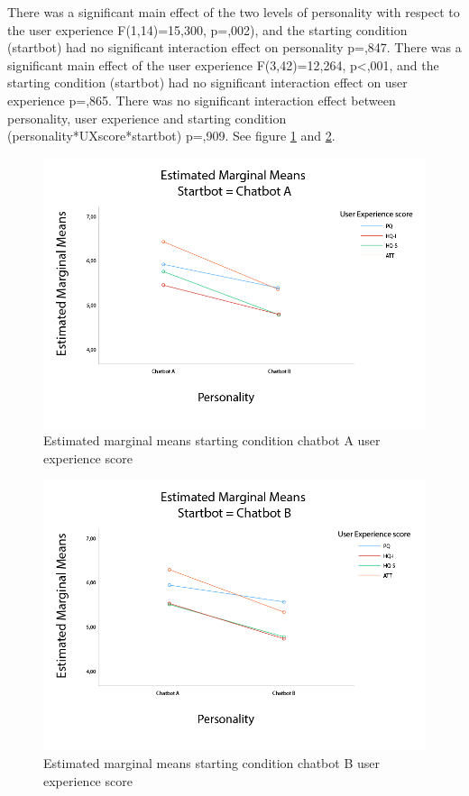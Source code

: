 There was a significant main effect of the two levels of personality with respect to the user experience F(1,14)=15,300, p=,002), and the starting condition (startbot) had no significant interaction effect on personality p=,847. There was a significant main effect of the user experience F(3,42)=12,264, p<,001, and the starting condition (startbot) had no significant interaction effect on user experience p=,865. There was no significant interaction effect between personality, user experience and starting condition (personality*UXscore*startbot) p=,909. See figure \ref{fig:startA} and \ref{fig:startB}.

\begin{figure}[h]
    \centering
    \includegraphics[scale=0.4]{figures/MMeanStartbotA.png}
    \caption{Estimated marginal means starting condition chatbot A user experience score}
    \label{fig:startA}
\end{figure}

\begin{figure}
    \centering
    \includegraphics[scale=0.4]{figures/MMeanStartbotB.png}
    \caption{Estimated marginal means starting condition chatbot B user experience score}
    \label{fig:startB}
\end{figure}

